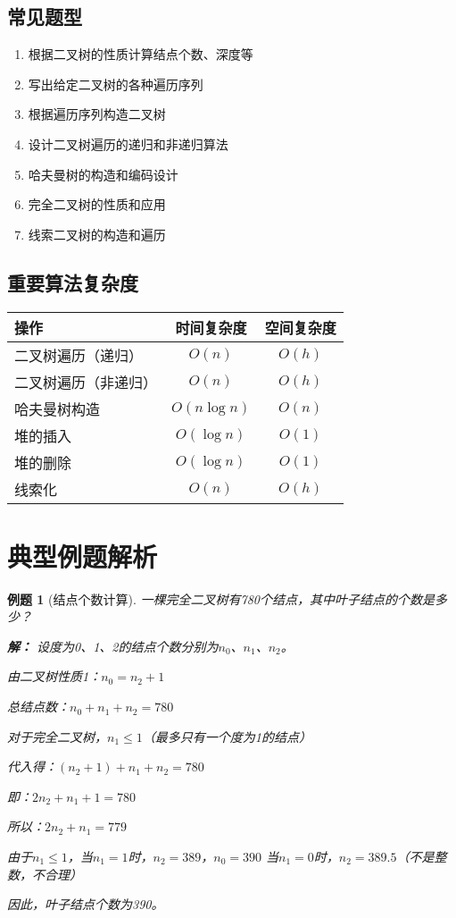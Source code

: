 \documentclass[12pt,a4paper]{amsart}
\newtheorem{example}{例题}[section]
\begin{document}
\subsection{常见题型}

\begin{enumerate}
\item 根据二叉树的性质计算结点个数、深度等
\item 写出给定二叉树的各种遍历序列
\item 根据遍历序列构造二叉树
\item 设计二叉树遍历的递归和非递归算法
\item 哈夫曼树的构造和编码设计
\item 完全二叉树的性质和应用
\item 线索二叉树的构造和遍历
\end{enumerate}

\subsection{重要算法复杂度}

\begin{center}
\begin{tabular}{|l|c|c|}
\hline
\textbf{操作} & \textbf{时间复杂度} & \textbf{空间复杂度} \\
\hline
二叉树遍历（递归） & $O(n)$ & $O(h)$ \\
二叉树遍历（非递归） & $O(n)$ & $O(h)$ \\
哈夫曼树构造 & $O(n\log n)$ & $O(n)$ \\
堆的插入 & $O(\log n)$ & $O(1)$ \\
堆的删除 & $O(\log n)$ & $O(1)$ \\
线索化 & $O(n)$ & $O(h)$ \\
\hline
\end{tabular}
\end{center}

\section{典型例题解析}

\begin{example}[结点个数计算]
一棵完全二叉树有780个结点，其中叶子结点的个数是多少？

\textbf{解：}
设度为0、1、2的结点个数分别为$n_0$、$n_1$、$n_2$。

由二叉树性质1：$n_0 = n_2 + 1$

总结点数：$n_0 + n_1 + n_2 = 780$

对于完全二叉树，$n_1 \leq 1$（最多只有一个度为1的结点）

代入得：$(n_2 + 1) + n_1 + n_2 = 780$

即：$2n_2 + n_1 + 1 = 780$

所以：$2n_2 + n_1 = 779$

由于$n_1 \leq 1$，当$n_1 = 1$时，$n_2 = 389$，$n_0 = 390$
当$n_1 = 0$时，$n_2 = 389.5$（不是整数，不合理）

因此，叶子结点个数为390。
\end{example}
\end{document}
